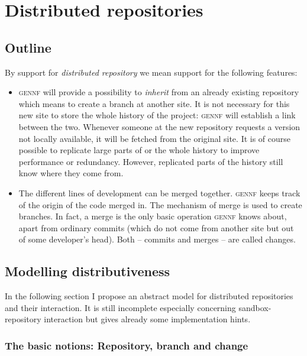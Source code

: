 \documentclass[fleqn, 10pt, a4paper]{article}
\begin{document}
\section{Distributed repositories \label{distrib}}

\subsection{Outline}

By support for \emph{distributed repository} we mean support for the following
features:

\begin{itemize}
\item \textsc{gennf} will provide a possibility to \emph{inherit} from an
already existing repository which means to create a branch
at another site. It is not necessary for this new site to store the
whole history of the project: \textsc{gennf} will establish
a link between the two.
Whenever someone at the new repository requests a version not locally
available, it will be fetched from the original site. It is of course
possible to replicate large parts of or the whole history to improve
performance or redundancy. However, replicated parts of the history still
know where they come from.

\item The different lines of development can be merged together.
\textsc{gennf} keeps track of the origin of the code merged in. The mechanism
of merge is used to create branches. In fact, a merge is the only
basic operation \textsc{gennf} knows about, apart from ordinary commits (which
do not come from another site but out of some developer's head).
Both -- commits and merges -- are called changes.
\end{itemize}


\subsection{Modelling distributiveness}

In the following section I propose an abstract model for distributed
repositories and their interaction. It is still incomplete
especially concerning sandbox-repository interaction but gives already
some implementation hints.

\subsubsection{The basic notions: Repository, branch and change}
\end{document}
